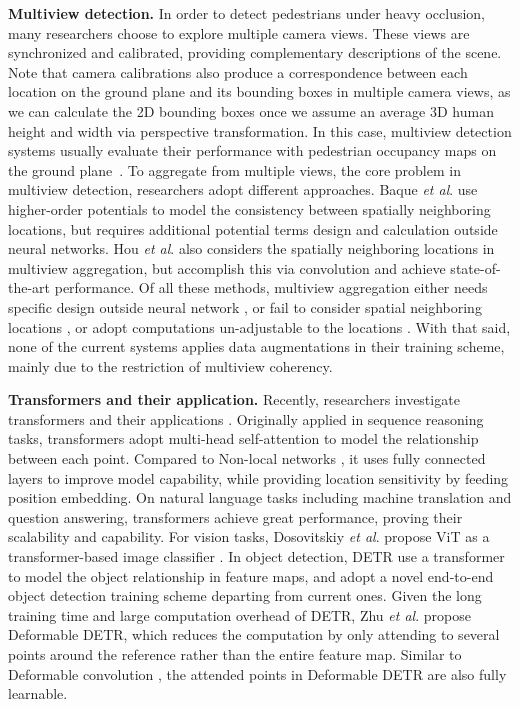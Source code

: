 \documentclass[sigconf,authorversion,nonacm]{acmart}
\newcommand{\etal}{\textit{et al}. }
\begin{document}
\textbf{Multiview detection.}
In order to detect pedestrians under heavy occlusion, many researchers choose to explore multiple camera views. These views are synchronized and calibrated, providing complementary descriptions of the scene. 
Note that camera calibrations also produce a correspondence between each location on the ground plane and its bounding boxes in multiple camera views, as we can calculate the 2D bounding boxes once we assume an average 3D human height and width via perspective transformation. In this case, multiview detection systems usually evaluate their performance with pedestrian occupancy maps on the ground plane~\cite{baque2017deep,chavdarova2018wildtrack,hou2020multiview}. 
To aggregate from multiple views, the core problem in multiview detection, researchers adopt different approaches. 
Baque \etal \cite{baque2017deep} use higher-order potentials to model the consistency between spatially neighboring locations, but requires additional potential terms design and calculation outside neural networks. Hou \etal \cite{hou2020multiview} also considers the spatially neighboring locations in multiview aggregation, but accomplish this via convolution and achieve state-of-the-art performance. 
Of all these methods, multiview aggregation either needs specific design outside neural network \cite{fleuret2007multicamera,baque2017deep}, or fail to consider spatial neighboring locations \cite{chavdarova2017deep}, or adopt computations un-adjustable to the locations \cite{hou2020multiview}. 
With that said, none of the current systems applies data augmentations in their training scheme, mainly due to the restriction of multiview coherency. 


\textbf{Transformers and their application.}
Recently, researchers investigate transformers \cite{vaswani2017attention,devlin2018bert} and their applications \cite{dosovitskiy2021an,carion2020end,ye2019cross,yang2020learning,sun2019videobert}. 
Originally applied in sequence reasoning tasks, transformers adopt multi-head self-attention to model the relationship between each point. Compared to Non-local networks \cite{wang2018non}, it uses fully connected layers to improve model capability, while providing location sensitivity by feeding position embedding. 
On natural language tasks including machine translation and question answering, transformers achieve great performance, proving their scalability and capability. 
For vision tasks, Dosovitskiy \etal propose ViT as a transformer-based image classifier \cite{dosovitskiy2021an}. In object detection, DETR \cite{carion2020end} use a transformer to model the object relationship in feature maps, and adopt a novel end-to-end object detection training scheme departing from current ones. Given the long training time and large computation overhead of DETR, Zhu \etal propose Deformable DETR, which reduces the computation by only attending to several points around the reference rather than the entire feature map. Similar to Deformable convolution \cite{dai2017deformable}, the attended points in Deformable DETR are also fully learnable. 
\end{document}

